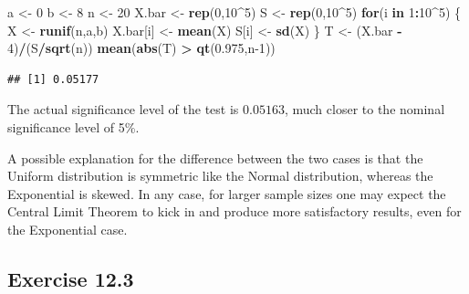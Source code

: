 \documentclass[
]{krantz}
\makeatletter
\newenvironment{Shaded}{\begin{snugshade}}{\end{snugshade}}
\newcommand{\ControlFlowTok}[1]{\textcolor[rgb]{0.13,0.29,0.53}{\textbf{#1}}}
\newcommand{\DecValTok}[1]{\textcolor[rgb]{0.00,0.00,0.81}{#1}}
\newcommand{\FloatTok}[1]{\textcolor[rgb]{0.00,0.00,0.81}{#1}}
\newcommand{\KeywordTok}[1]{\textcolor[rgb]{0.13,0.29,0.53}{\textbf{#1}}}
\newcommand{\NormalTok}[1]{#1}
\newcommand{\OperatorTok}[1]{\textcolor[rgb]{0.81,0.36,0.00}{\textbf{#1}}}
\newcommand{\StringTok}[1]{\textcolor[rgb]{0.31,0.60,0.02}{#1}}
\newenvironment{kframe}{%
\medskip{}
\setlength{\fboxsep}{.8em}
 \def\at@end@of@kframe{}%
 \ifinner\ifhmode%
  \def\at@end@of@kframe{\end{minipage}}%
  \begin{minipage}{\columnwidth}%
 \fi\fi%
 \def\FrameCommand##1{\hskip\@totalleftmargin \hskip-\fboxsep
 \colorbox{shadecolor}{##1}\hskip-\fboxsep
     \hskip-\linewidth \hskip-\@totalleftmargin \hskip\columnwidth}%
 \MakeFramed {\advance\hsize-\width
   \@totalleftmargin\z@ \linewidth\hsize
   \@setminipage}}%
 {\par\unskip\endMakeFramed%
 \at@end@of@kframe}
\renewenvironment{Shaded}{\begin{kframe}}{\end{kframe}}
\theoremstyle{definition}
\theoremstyle{definition}
\theoremstyle{definition}
\theoremstyle{remark}
\makeatother
\begin{document}
\begin{enumerate}
\begin{Shaded}
\begin{Highlighting}[]
\NormalTok{a <-}\StringTok{ }\DecValTok{0}
\NormalTok{b <-}\StringTok{ }\DecValTok{8}
\NormalTok{n <-}\StringTok{ }\DecValTok{20}
\NormalTok{X.bar <-}\StringTok{ }\KeywordTok{rep}\NormalTok{(}\DecValTok{0}\NormalTok{,}\DecValTok{10}\OperatorTok{^}\DecValTok{5}\NormalTok{)}
\NormalTok{S <-}\StringTok{ }\KeywordTok{rep}\NormalTok{(}\DecValTok{0}\NormalTok{,}\DecValTok{10}\OperatorTok{^}\DecValTok{5}\NormalTok{)}
\ControlFlowTok{for}\NormalTok{(i }\ControlFlowTok{in} \DecValTok{1}\OperatorTok{:}\DecValTok{10}\OperatorTok{^}\DecValTok{5}\NormalTok{) \{}
\NormalTok{  X <-}\StringTok{ }\KeywordTok{runif}\NormalTok{(n,a,b)}
\NormalTok{  X.bar[i] <-}\StringTok{ }\KeywordTok{mean}\NormalTok{(X)}
\NormalTok{  S[i] <-}\StringTok{ }\KeywordTok{sd}\NormalTok{(X)}
\NormalTok{\}}
\NormalTok{T <-}\StringTok{ }\NormalTok{(X.bar }\OperatorTok{-}\StringTok{ }\DecValTok{4}\NormalTok{)}\OperatorTok{/}\NormalTok{(S}\OperatorTok{/}\KeywordTok{sqrt}\NormalTok{(n))}
\KeywordTok{mean}\NormalTok{(}\KeywordTok{abs}\NormalTok{(T) }\OperatorTok{>}\StringTok{ }\KeywordTok{qt}\NormalTok{(}\FloatTok{0.975}\NormalTok{,n}\DecValTok{-1}\NormalTok{))}
\end{Highlighting}
\end{Shaded}

\begin{verbatim}
## [1] 0.05177
\end{verbatim}

  The actual significance level of the test is \(0.05163\), much closer to
  the nominal significance level of 5\%.

  A possible explanation for the difference between the two cases is that
  the Uniform distribution is symmetric like the Normal distribution,
  whereas the Exponential is skewed. In any case, for larger sample sizes
  one may expect the Central Limit Theorem to kick in and produce more
  satisfactory results, even for the Exponential case.
\end{enumerate}

\hypertarget{exercise-12.3}{%
\subsection*{Exercise 12.3}\label{exercise-12.3}}
\end{document}
